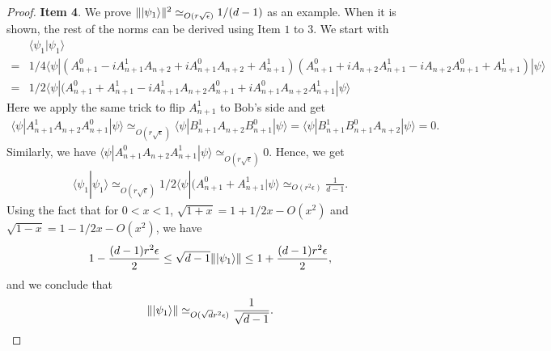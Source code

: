 \documentclass[11pt,letterpaper]{article}
\newcommand{\ket}[1]{|#1\rangle}
\newcommand{\bra}[1]{\langle#1|}
\newcommand{\braket}[2]{\langle#1|#2\rangle}
\DeclarePairedDelimiter{\norm}{\lVert}{\rVert}
\newcommand{\1}{\mathbb{1}}
\newcommand{\ep}{\epsilon}
\newcommand{\se}{\sqrt{\epsilon}}
\newcommand{\sd}{\sqrt{d}}
\newcommand{\appd}[1]{\simeq_{#1}}
\theoremstyle{definition}
\begin{document}
\begin{proof}
	\textbf{Item 4}. We prove $\norm{\ket{\psi_1}}^2 \appd{O(r \se)} 1/(d-1)$ as an example. When it is shown,
	the rest of the norms can be derived using Item $1$ to $3$.
	We start with
	\begin{align*}
		&\braket{\psi_1}{\psi_1} \\
		=&1/4\bra{\psi}(A_{n+1}^0 - iA_{n+1}^1A_{n+2} + iA_{n+1}^0A_{n+2} +A_{n+1}^1)(A_{n+1}^0 + iA_{n+2}A_{n+1}^1 -iA_{n+2}A_{n+1}^0 + A_{n+1}^1)\ket{\psi}\\
		=&1/2\bra{\psi}(A_{n+1}^0+A_{n+1}^1-iA_{n+1}^1A_{n+2}A_{n+1}^0+iA_{n+1}^0A_{n+2}A_{n+1}^1\ket{\psi}
	\end{align*}
	Here we apply the same trick to flip $A_{n+1}^1$ to Bob's side and get 
	\begin{align}
		\bra{\psi}A_{n+1}^1A_{n+2}A_{n+1}^0\ket{\psi} \appd{O(r\se)} \bra{\psi}B_{n+1}^1A_{n+2}B_{n+1}^0\ket{\psi} 
		= \bra{\psi}B_{n+1}^1B_{n+1}^0A_{n+2}\ket{\psi} = 0.
	\end{align}
	Similarly, we have $\bra{\psi}A_{n+1}^0A_{n+2}A_{n+1}^1\ket{\psi} \appd{ O(r\se)} 0$.
	Hence, we get 
	\begin{align}
		\braket{\psi_1}{\psi_1} \appd{O(r\se)} 1/2\bra{\psi}(A_{n+1}^0+A_{n+1}^1\ket{\psi} \appd{O(r^2\ep)} 
		 \frac{1}{d-1}.
	\end{align}
	Using the fact that for $0 < x < 1$, $\sqrt{1+x} = 1 + 1/2 x - O(x^2)$ and $\sqrt{1-x} = 1- 1/2x - O(x^2)$,
	we have
	\begin{align}
		1-\frac{(d-1)r^2 \ep}{2} \leq \sqrt{d-1} \norm{\ket{\psi_1}} \leq 1 + \frac{(d-1)r^2 \ep}{2},
	\end{align}
	and we conclude that 
	\begin{align}
		\norm{\ket{\psi_1}} \appd{O(\sd r^2 \ep)} \frac{1}{\sqrt{d-1}}.
	\end{align}	
	

\end{proof}
\end{document}
